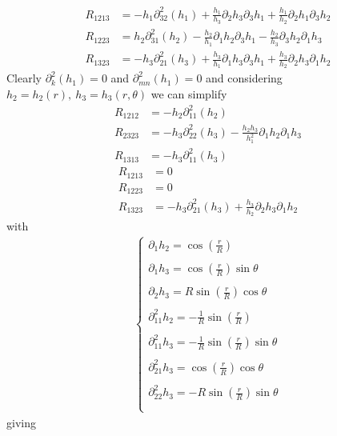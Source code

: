 \begin{align}
R_{1213}&=-h_1\partial_{32}^2(h_1)+\frac{h_1}{h_3}\partial_2 h_3\partial_3 h_1+\frac{h_1}{h_2}\partial_2 h_1\partial_3 h_2\\
R_{1223}&=h_2\partial_{31}^2(h_2)-\frac{h_2}{h_1}\partial_1 h_2\partial_3 h_1-\frac{h_2}{h_3}\partial_3 h_2\partial_1 h_3\\
R_{1323}&=
-h_3\partial_{21}^2(h_3)+\frac{h_3}{h_1}\partial_1 h_3\partial_3 h_1+\frac{h_3}{h_2}\partial_2 h_3\partial_1 h_2
\end{align}
Clearly $\partial_{k}^2(h_1)=0$ and $\partial_{mn}^2(h_1)=0$ and considering $h_2 = h_2(r), \ h_3 = h_3(r,\theta)$
we can simplify 
\begin{align}
R_{1212}&=
-h_2\partial_{11}^2(h_2)\\
R_{2323}&=
-h_3\partial_{22}^2(h_3)
-\frac{h_2 h_3}{h_1^2}\partial_1 h_2\partial_1 h_3\\
R_{1313}&=
-h_3\partial_{11}^2(h_3)
\end{align}
\begin{align}
R_{1213}&=0\\
R_{1223}&=0\\
R_{1323}&=
-h_3\partial_{21}^2(h_3)+\frac{h_3}{h_2}\partial_2 h_3\partial_1 h_2
\end{align}
with 
\begin{align}
\left\{\begin{array}{l}
\partial_1 h_2=\cos\left(\frac{r}{R}\right)\\\\
\partial_1 h_3=\cos\left(\frac{r}{R}\right)\sin\theta\\\\
\partial_2 h_3=R\sin\left(\frac{r}{R}\right)\cos\theta\\\\
\partial^2_{11} h_2=-\frac{1}{R}\sin\left(\frac{r}{R}\right)\\\\
\partial^2_{11} h_3=-\frac{1}{R}\sin\left(\frac{r}{R}\right)\sin\theta\\\\
\partial^2_{21} h_3=\cos\left(\frac{r}{R}\right)\cos\theta\\\\
\partial^2_{22} h_3=-R\sin\left(\frac{r}{R}\right)\sin\theta\\\\
\end{array}\right.
\end{align}
giving
